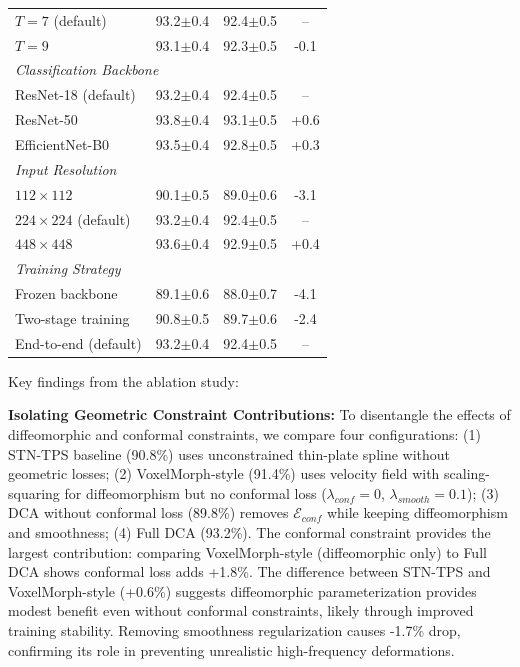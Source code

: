 \documentclass[final,3p,times,review,sort&compress]{elsarticle}
\begin{document}
\begin{table}[t]
\begin{tabularx}{\textwidth}{Xccc}
\quad $T=7$ (default) & 93.2$\pm$0.4 & 92.4$\pm$0.5 & -- \\
\quad $T=9$ & 93.1$\pm$0.4 & 92.3$\pm$0.5 & -0.1 \\
\hline
\multicolumn{4}{l}{\textit{Classification Backbone}} \\
\quad ResNet-18 (default) & 93.2$\pm$0.4 & 92.4$\pm$0.5 & -- \\
\quad ResNet-50 & 93.8$\pm$0.4 & 93.1$\pm$0.5 & +0.6 \\
\quad EfficientNet-B0 & 93.5$\pm$0.4 & 92.8$\pm$0.5 & +0.3 \\
\hline
\multicolumn{4}{l}{\textit{Input Resolution}} \\
\quad $112 \times 112$ & 90.1$\pm$0.5 & 89.0$\pm$0.6 & -3.1 \\
\quad $224 \times 224$ (default) & 93.2$\pm$0.4 & 92.4$\pm$0.5 & -- \\
\quad $448 \times 448$ & 93.6$\pm$0.4 & 92.9$\pm$0.5 & +0.4 \\
\hline
\multicolumn{4}{l}{\textit{Training Strategy}} \\
\quad Frozen backbone & 89.1$\pm$0.6 & 88.0$\pm$0.7 & -4.1 \\
\quad Two-stage training & 90.8$\pm$0.5 & 89.7$\pm$0.6 & -2.4 \\
\quad End-to-end (default) & 93.2$\pm$0.4 & 92.4$\pm$0.5 & -- \\
\hline
\end{tabularx}
\end{table}

Key findings from the ablation study:

\textbf{Isolating Geometric Constraint Contributions:} To disentangle the effects of diffeomorphic and conformal constraints, we compare four configurations: (1) STN-TPS baseline (90.8\%) uses unconstrained thin-plate spline without geometric losses; (2) VoxelMorph-style (91.4\%) uses velocity field with scaling-squaring for diffeomorphism but no conformal loss ($\lambda_{conf}=0$, $\lambda_{smooth}=0.1$); (3) DCA without conformal loss (89.8\%) removes $\mathcal{E}_{conf}$ while keeping diffeomorphism and smoothness; (4) Full DCA (93.2\%). The conformal constraint provides the largest contribution: comparing VoxelMorph-style (diffeomorphic only) to Full DCA shows conformal loss adds +1.8\%. The difference between STN-TPS and VoxelMorph-style (+0.6\%) suggests diffeomorphic parameterization provides modest benefit even without conformal constraints, likely through improved training stability. Removing smoothness regularization causes -1.7\% drop, confirming its role in preventing unrealistic high-frequency deformations.
\end{document}
